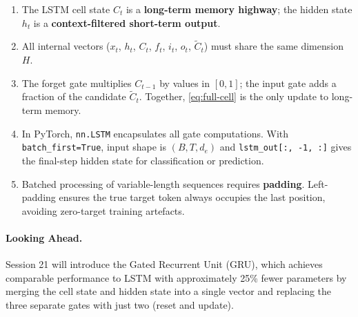 \documentclass[12pt,a4paper]{article}
\begin{document}
\begin{keyinsight}[title=Core Takeaways from Session 20]
\begin{enumerate}[label=\arabic*.]
  \item The LSTM cell state $C_t$ is a \textbf{long-term memory highway};
    the hidden state $h_t$ is a \textbf{context-filtered short-term output}.
  \item All internal vectors ($x_t$, $h_t$, $C_t$, $f_t$, $i_t$, $o_t$,
    $\tilde{C}_t$) must share the same dimension $H$.
  \item The forget gate multiplies $C_{t-1}$ by values in $[0,1]$;
    the input gate adds a fraction of the candidate $\tilde{C}_t$.
    Together, \cref{eq:full-cell} is the only update to long-term memory.
  \item In PyTorch, \texttt{nn.LSTM} encapsulates all gate computations.
    With \texttt{batch\_first=True}, input shape is
    $(B, T, d_e)$ and \texttt{lstm\_out[:, -1, :]} gives the final-step
    hidden state for classification or prediction.
  \item Batched processing of variable-length sequences requires
    \textbf{padding}.  Left-padding ensures the true target token always
    occupies the last position, avoiding zero-target training artefacts.
\end{enumerate}
\end{keyinsight}

\paragraph{Looking Ahead.}
Session 21 will introduce the Gated Recurrent Unit (GRU), which achieves
comparable performance to LSTM with approximately 25\% fewer parameters by
merging the cell state and hidden state into a single vector and replacing
the three separate gates with just two (reset and update).
\end{document}
